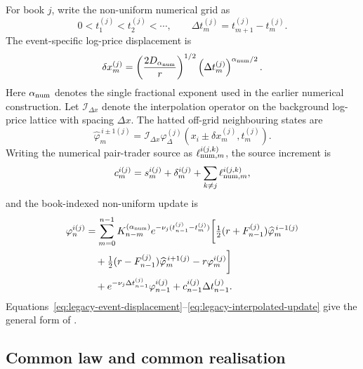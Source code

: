 \documentclass[5p,final]{elsarticle}
\begin{document}
For book $j$, write the non-uniform numerical grid as
\begin{equation}
    0<t_1^{(j)}<t_2^{(j)}<\cdots,
    \qquad
    \Delta t_m^{(j)}=t_{m+1}^{(j)}-t_m^{(j)}.
\end{equation}
The event-specific log-price displacement is
\begin{equation}
    \delta x_m^{(j)}
    =\left(\frac{2D_{\alpha_{\rm num}}}{r}\right)^{1/2}
    \left(\Delta t_m^{(j)}\right)^{\alpha_{\rm num}/2}.
    \label{eq:legacy-event-displacement}
\end{equation}
Here $\alpha_{\rm num}$ denotes the single fractional exponent used in the earlier numerical construction. Let $\mathcal I_{\Delta x}$ denote the interpolation operator on the background log-price lattice with spacing $\Delta x$. The hatted off-grid neighbouring states are
\begin{equation}
    \widehat\varphi_m^{\,i\pm1(j)}
    =\mathcal I_{\Delta x}\varphi_\Delta^{(j)}
    \left(x_i\pm\delta x_m^{(j)},t_m^{(j)}\right).
    \label{eq:legacy-interpolated-neighbours}
\end{equation}
Writing the numerical pair-trader source as $\ell_{{\rm num},m}^{i(j,k)}$, the source increment is
\begin{equation}
    c_m^{i(j)}=s_m^{i(j)}+\delta_m^{i(j)}
    +\sum_{k\ne j}\ell_{{\rm num},m}^{i(j,k)},
\end{equation}
and the book-indexed non-uniform update is
\begin{equation}
\begin{aligned}
\varphi_n^{i(j)}
&=\sum_{m=0}^{n-1}K_{n-m}^{(\alpha_{\rm num})}
 e^{-\nu_j(t_{n-1}^{(j)}-t_m^{(j)})}\bigg[
 \tfrac12(r+F_{n-1}^{(j)})\widehat\varphi_m^{\,i-1(j)}\\
&\quad+\tfrac12(r-F_{n-1}^{(j)})\widehat\varphi_m^{\,i+1(j)}
-r\varphi_m^{i(j)}\bigg]\\
&\quad+e^{-\nu_j\Delta t_{n-1}^{(j)}}\varphi_{n-1}^{i(j)}
+c_{n-1}^{i(j)}\Delta t_{n-1}^{(j)}.
\end{aligned}
\label{eq:legacy-interpolated-update}
\end{equation}
Equations~\eqref{eq:legacy-event-displacement}--\eqref{eq:legacy-interpolated-update} give the general form of \citet{DianaGebbie2025,BauerDianaGebbie2024}. 

\subsection{Common law and common realisation}
\end{document}
